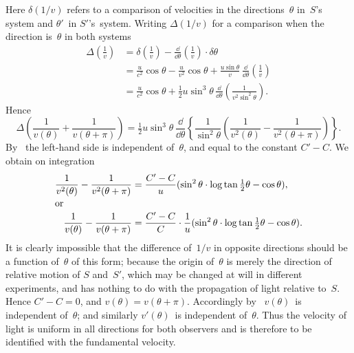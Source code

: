\documentclass[12pt]{book}
\begin{document}
Here $\delta(1/v)$ refers to a comparison of velocities in the directions~$\theta$ in~$S$'s
system and $\theta'$~in $S'$'s~system. Writing $\Delta(1/v)$ for a comparison when the
direction is~$\theta$ in both systems
\begin{align*}
  \Delta\left(\frac{1}{v}\right)
  &= \delta\left(\frac{1}{v}\right) - \frac{\dd}{\dd\theta}\left(\frac{1}{v}\right)\cdot\delta\theta\\
  &= \frac{u}{c^{2}} \cos\theta - \frac{u}{v^{2}} \cos\theta + \frac{u\sin\theta}{v}\, \frac{\dd}{\dd\theta}\left(\frac{1}{v}\right) \\
  &= \frac{u}{c^{2}} \cos\theta + \tfrac{1}{2} u \sin^{3}\theta\, \frac{\dd}{\dd\theta} \left(\frac{1}{v^{2} \sin^{2}\theta}\right).
\end{align*}
Hence
\[
\Delta\left(\frac{1}{v(\theta)} + \frac{1}{v(\theta + \pi)}\right)
= \tfrac{1}{2} u\sin^{3}\theta\, \frac{\dd}{\dd\theta}\left\{\frac{1}{\sin^{2}\theta}\left(\frac{1}{v^{2}(\theta)} - \frac{1}{v^{2}(\theta + \pi)}\right)\right\}.
\]
By~ the left-hand side is independent of~$\theta$, and equal to the constant
$C' - C$. We obtain on integration
\begin{align*}
  \frac{1}{v^{2}(\theta)} - \frac{1}{v^{2}(\theta + \pi)}
  &= \frac{C' - C}{u} (\sin^{2}\theta\cdot\log\tan \tfrac{1}{2}\theta - \cos\theta), \\
\intertext{or}
  \frac{1}{v(\theta)} - \frac{1}{v(\theta + \pi)}
  &= \frac{C' - C}{C} \cdot \frac{1}{u} (\sin^{2}\theta \cdot \log\tan \tfrac{1}{2}\theta - \cos\theta).
\end{align*}
It is clearly impossible that the difference of~$1/v$ in opposite directions should
be a function of~$\theta$ of this form; because the origin of~$\theta$ is merely the direction
of relative motion of $S$ and~$S'$, which may be changed at will in different
experiments, and has nothing to do with the propagation of light relative to~$S$.
Hence $C' - C = 0$, and $v(\theta) = v(\theta + \pi)$. Accordingly by~ $v(\theta)$~is independent
of~$\theta$; and similarly $v'(\theta)$~is independent of~$\theta$. Thus the velocity of
light is uniform in all directions for both observers and is therefore to be
identified with the fundamental velocity.
\end{document}
